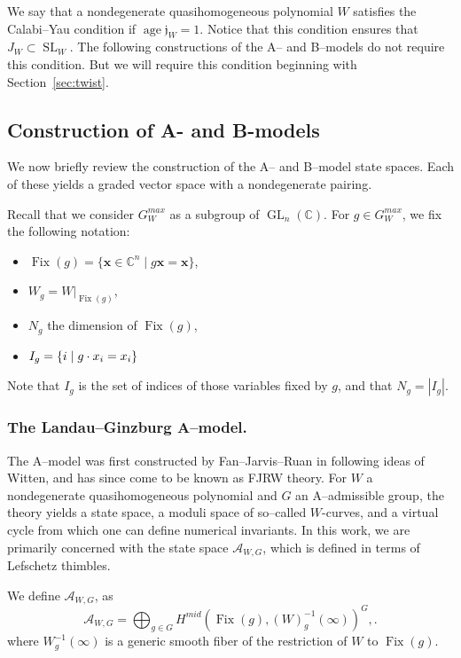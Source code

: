 \documentclass[10pt, letterpaper]{amsart}
\theoremstyle{remark}
\newcommand{\CC}{\mathbb C}
\newcommand{\sA}{\mathscr{A}}
\newcommand{\jw}{\mathfrak{j}}
\newcommand{\set}[1]{\{#1\}}
\newcommand{\mb}[1]{\mathbf{#1}}
\DeclareMathOperator{\SL}{SL}
\DeclareMathOperator{\GL}{GL}
\DeclareMathOperator{\Fix}{Fix}
\DeclareMathOperator{\age}{age}
\begin{document}
We say that a nondegenerate quasihomogeneous polynomial $W$ satisfies the Calabi--Yau condition if $\age \jw_W=1$. Notice that this condition ensures that $J_W\subset \SL_W$. The following constructions of the A-- and B--models do not require this condition. But we will require this condition beginning with Section~\ref{sec:twist}. 


\subsection{Construction of A- and B-models}
We now briefly review the construction of the A-- and B--model state spaces. Each of these yields a graded vector space with a nondegenerate pairing.

Recall that we consider $G^{max}_W$ as a subgroup of $\GL_n(\CC)$. For $g\in G^{max}_W$, we fix the following notation:
\begin{itemize}
\item $\Fix(g)=\set{ \mb{x}\in \CC^n\mid g\mb{x}=\mb{x}}$, 
\item $W_g=W|_{\Fix(g)}$, 
\item $N_g$ the dimension of $\Fix(g)$,
\item $I_g = \{i \hspace{.1cm} |\hspace{.1cm}  g \cdot x_i = x_i\}$ 
\end{itemize}
Note that $I_g$ is the set of indices of those variables fixed by $g$, and that $N_g=|I_g|$.
\subsubsection*{The Landau--Ginzburg A--model.} The A--model was first constructed by Fan--Jarvis--Ruan in \cite{FJR13} following ideas of Witten, and has since come to be known as FJRW theory. For $W$ a nondegenerate quasihomogeneous polynomial and $G$ an A--admissible group, the theory yields a state space, a moduli space of so--called $W$-curves, and a virtual cycle from which one can define numerical invariants. In this work, we are primarily concerned with the state space $\sA_{W,G}$, which is defined in terms of Lefschetz thimbles.

We define $\sA_{W,G}$, as %
\begin{equation}\label{e:Aspace}
\sA_{W,G} = \bigoplus_{g \in G} H^{mid} (\Fix(g),(W)_g^{-1}( \infty))^G,.
\end{equation}
where $W_g^{-1}(\infty)$ is a generic smooth fiber of the restriction of $W$ to $\Fix(g)$.
\end{document}

